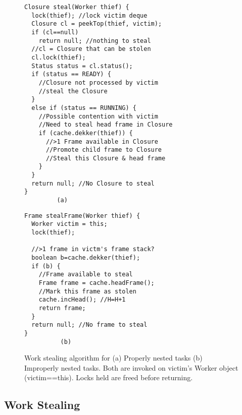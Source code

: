 \begin{figure*}
\begin{minipage}{0.5\textwidth}
\scriptsize
\begin{verbatim}
Closure steal(Worker thief) {
  lock(thief); //lock victim deque
  Closure cl = peekTop(thief, victim);
  if (cl==null) 
    return null; //nothing to steal
  //cl = Closure that can be stolen
  cl.lock(thief);
  Status status = cl.status();
  if (status == READY) {
    //Closure not processed by victim
    //steal the Closure
  }
  else if (status == RUNNING) {
    //Possible contention with victim
    //Need to steal head frame in Closure
    if (cache.dekker(thief)) {
      //>1 Frame available in Closure
      //Promote child frame to Closure 
      //Steal this Closure & head frame
    } 
  }
  return null; //No Closure to steal
}
         (a)
\end{verbatim}
\end{minipage}%
\begin{minipage}{0.5\textwidth}
\scriptsize
\begin{verbatim}
Frame stealFrame(Worker thief) {
  Worker victim = this;
  lock(thief);

  //>1 frame in victm's frame stack?
  boolean b=cache.dekker(thief);
  if (b) {
    //Frame available to steal
    Frame frame = cache.headFrame();
    //Mark this frame as stolen
    cache.incHead(); //H=H+1
    return frame;
  }
  return null; //No frame to steal
}
          (b) 
\end{verbatim}
\end{minipage}
\caption{Work stealing algorithm for (a) Properly nested tasks (b)
  Improperly nested tasks. Both are invoked on victim's
  Worker object (victim==this). Locks held are freed before returning.}%
\label{fig:stealing-alg}
\end{figure*}



\subsection{Work Stealing}



